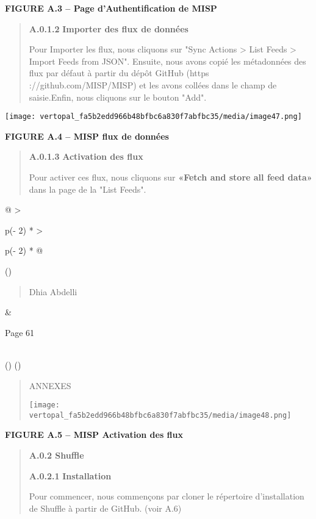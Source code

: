 \documentclass[
]{article}
\begin{document}
\textbf{FIGURE A.3 -- Page d'Authentification de MISP}

\begin{quote}
\textbf{A.0.1.2} \textbf{Importer des flux de données}

Pour Importer les flux, nous cliquons sur "Sync Actions \textgreater{}
List Feeds \textgreater{} Import Feeds from JSON". Ensuite, nous avons
copié les métadonnées des flux par défaut à partir du dépôt GitHub
(https ://github.com/MISP/MISP) et les avons collées dans le champ de
saisie.Enfin, nous cliquons sur le bouton "Add".
\end{quote}

\texttt{[image: vertopal\_fa5b2edd966b48bfbc6a830f7abfbc35/media/image47.png]}

\textbf{FIGURE A.4 -- MISP flux de données}

\begin{quote}
\textbf{A.0.1.3} \textbf{Activation des flux}

Pour activer ces flux, nous cliquons sur \textbf{«Fetch and store all
feed data»} dans la page de la "List Feeds".
\end{quote}

\begin{longtable}[]{@{}
  >{\raggedright\arraybackslash}p{(\columnwidth - 2\tabcolsep) * }
  >{\raggedright\arraybackslash}p{(\columnwidth - 2\tabcolsep) * }@{}}
\toprule()
\begin{minipage}[b]{\linewidth}\raggedright
\begin{quote}
Dhia Abdelli
\end{quote}
\end{minipage} & \begin{minipage}[b]{\linewidth}\raggedright
Page 61
\end{minipage} \\
\midrule()
\endhead
\bottomrule()
\end{longtable}

\begin{quote}
ANNEXES

\texttt{[image: vertopal\_fa5b2edd966b48bfbc6a830f7abfbc35/media/image48.png]}
\end{quote}

\textbf{FIGURE A.5 -- MISP Activation des flux}

\begin{quote}
\textbf{A.0.2 Shuffle}

\textbf{A.0.2.1} \textbf{Installation}

Pour commencer, nous commençons par cloner le répertoire d'installation
de Shuffle à partir de GitHub. (voir A.6)
\end{quote}
\end{document}

